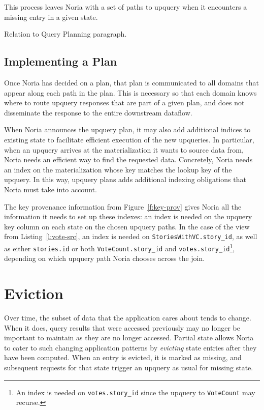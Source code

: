 This process leaves Noria with a set of paths to upquery when it encounters a
missing entry in a given state.

\begin{inprogress}
  Relation to Query Planning paragraph.
\end{inprogress}

\subsection{Implementing a Plan}

Once Noria has decided on a plan, that plan is communicated to all domains
that appear along each path in the plan. This is necessary so that each domain
knows where to route upquery responses that are part of a given plan, and does
not disseminate the response to the entire downstream dataflow.

When Noria announces the upquery plan, it may also add additional indices
to existing state to facilitate efficient execution of the new upqueries. In
particular, when an upquery arrives at the materialization it wants to source
data from, Noria needs an efficient way to find the requested data. Concretely,
Noria needs an index on the materialization whose key matches the lookup key of
the upquery. In this way, upquery plans adds additional indexing obligations
that Noria must take into account.

The key provenance information from Figure~\vref{f:key-prov} gives Noria all the
information it needs to set up these indexes: an index is needed on the upquery
key column on each state on the chosen upquery paths. In the case of the view
from Listing~\ref{l:vote-src}, an index is needed on
\texttt{StoriesWithVC.story\_id}, as well as either \texttt{stories.id} or both
\texttt{VoteCount.story\_id} and \texttt{votes.story\_id}\footnote{An index is
needed on \texttt{votes.story\_id} since the upquery to \texttt{VoteCount} may
recurse.}, depending on which upquery path Noria chooses across the join.

\section{Eviction}

Over time, the subset of data that the application cares about tends to change.
When it does, query results that were accessed previously may no longer be
important to maintain as they are no longer accessed. Partial state allows Noria
to cater to such changing application patterns by \textit{evicting} state
entries after they have been computed. When an entry is evicted, it is marked as
missing, and subsequent requests for that state trigger an upquery as usual for
missing state.

